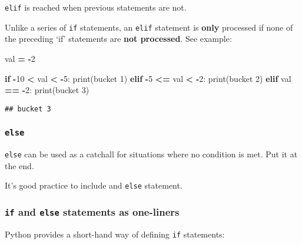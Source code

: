 \documentclass[
]{book}
\newenvironment{Shaded}{\begin{snugshade}}{\end{snugshade}}
\newcommand{\BuiltInTok}[1]{#1}
\newcommand{\ControlFlowTok}[1]{\textcolor[rgb]{0.13,0.29,0.53}{\textbf{#1}}}
\newcommand{\DecValTok}[1]{\textcolor[rgb]{0.00,0.00,0.81}{#1}}
\newcommand{\NormalTok}[1]{#1}
\newcommand{\OperatorTok}[1]{\textcolor[rgb]{0.81,0.36,0.00}{\textbf{#1}}}
\newcommand{\StringTok}[1]{\textcolor[rgb]{0.31,0.60,0.02}{#1}}
\begin{document}
\texttt{elif} is reached when previous statements are not.

Unlike a series of \texttt{if} statements, an \texttt{elif} statement is \textbf{only} processed if none of the preceding `if' statements are \textbf{not processed}. See example:

\begin{Shaded}
\begin{Highlighting}[]
\NormalTok{val }\OperatorTok{=} \OperatorTok{{-}}\DecValTok{2}

\ControlFlowTok{if} \OperatorTok{{-}}\DecValTok{10} \OperatorTok{\textless{}}\NormalTok{ val }\OperatorTok{\textless{}} \OperatorTok{{-}}\DecValTok{5}\NormalTok{:}
    \BuiltInTok{print}\NormalTok{(}\StringTok{\textquotesingle{}bucket 1\textquotesingle{}}\NormalTok{)}
\ControlFlowTok{elif} \OperatorTok{{-}}\DecValTok{5} \OperatorTok{\textless{}=}\NormalTok{ val }\OperatorTok{\textless{}} \OperatorTok{{-}}\DecValTok{2}\NormalTok{:}
    \BuiltInTok{print}\NormalTok{(}\StringTok{\textquotesingle{}bucket 2\textquotesingle{}}\NormalTok{)}
\ControlFlowTok{elif}\NormalTok{ val }\OperatorTok{==} \OperatorTok{{-}}\DecValTok{2}\NormalTok{:}
    \BuiltInTok{print}\NormalTok{(}\StringTok{\textquotesingle{}bucket 3\textquotesingle{}}\NormalTok{)}
\end{Highlighting}
\end{Shaded}

\begin{verbatim}
## bucket 3
\end{verbatim}

\subsubsection{\texorpdfstring{\textbf{\texttt{else}}}{else}}\label{else}

\texttt{else} can be used as a catchall for situations where no condition is met. Put it at the end.

It's good practice to include and \texttt{else} statement.

\subsubsection{\texorpdfstring{\texttt{if} and \texttt{else} statements as one-liners}{if and else statements as one-liners}}\label{if-and-else-statements-as-one-liners}

Python provides a short-hand way of defining \texttt{if} statements:
\end{document}
